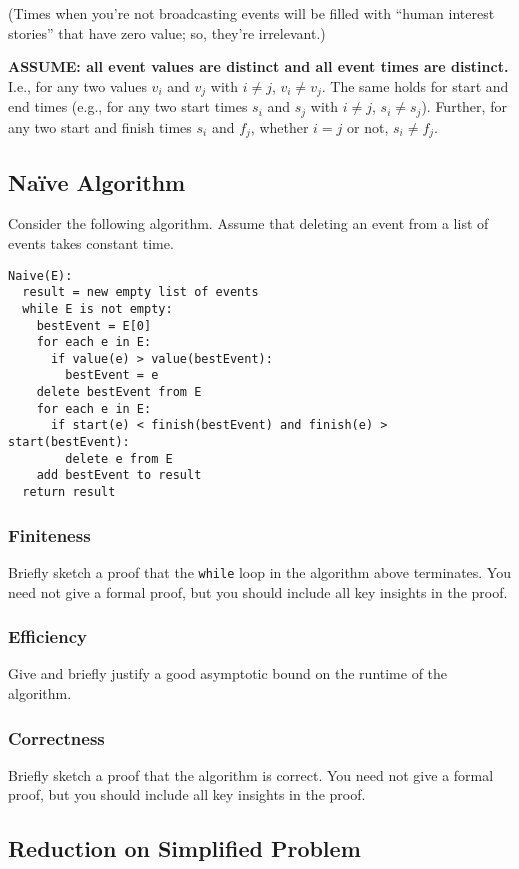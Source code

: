 \documentclass[11pt, oneside]{article}   	%
\theoremstyle{definition}
\theoremstyle{remark}
\begin{document}
(Times when you're not broadcasting events will be filled with ``human
interest stories'' that have zero value; so, they're irrelevant.)

\textbf{ASSUME: all event values are distinct and all event times are distinct.} I.e., for any two values $v_i$ and $v_j$ with $i \neq j$,
$v_i \neq v_j$. The same holds for start and end times (e.g., for any
two start times $s_i$ and $s_j$ with $i \neq j$, $s_i \neq
s_j$). Further, for any two start and finish times $s_i$ and $f_j$,
whether $i = j$ or not, $s_i \neq f_j$.
\subsection{Na\"ive Algorithm}

Consider the following algorithm. Assume that deleting an event from a
list of events takes constant time.

\begin{verbatim}
Naive(E):
  result = new empty list of events
  while E is not empty:
    bestEvent = E[0]
    for each e in E:
      if value(e) > value(bestEvent):
        bestEvent = e
    delete bestEvent from E
    for each e in E:
      if start(e) < finish(bestEvent) and finish(e) > start(bestEvent):
        delete e from E
    add bestEvent to result
  return result
\end{verbatim}
\subsubsection{Finiteness}

Briefly sketch a proof that the \texttt{while} loop in the algorithm above
terminates. You need not give a formal proof, but you should include
all key insights in the proof.
\subsubsection{Efficiency}

Give and briefly justify a good asymptotic bound on the runtime of the
algorithm.
\subsubsection{Correctness}
Briefly sketch a proof that the algorithm is correct. You need not
give a formal proof, but you should include all key insights in the
proof.
\subsection{Reduction on Simplified Problem}
\end{document}
